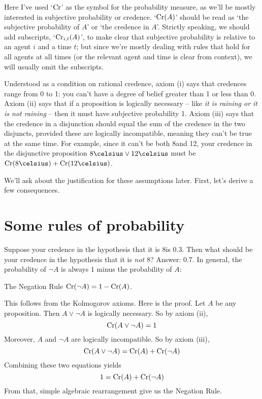 Here I've used `$\text{Cr}$' as the symbol for the probability measure, as
we'll be mostly interested in subjective probability or credence.
`$\text{Cr}(A)$' should be read as `the subjective probability of $A$' or
`the credence in $A$'. Strictly speaking, we should add subscripts,
`$\text{Cr}_{i,t}(A)$', to make clear that subjective probability is relative
to an agent $i$ and a time $t$; but since we're mostly dealing with
rules that hold for all agents at all times (or the relevant agent and
time is clear from context), we will usually omit the subscripts.

Understood as a condition on rational credence, axiom (i) says that
credences range from 0 to 1: you can't have a degree of belief greater
than 1 or less than 0. Axiom (ii) says that if a proposition is
logically necessary -- like \emph{it is raining or it is not raining}
-- then it must have subjective probability 1. Axiom (iii) says that
the credence in a disjunction should equal the sum of the credence in
the two disjuncts, provided these are logically incompatible, meaning
they can't be true at the same time. For example, since it can't be
both 8\celsius and 12\celsius, your credence in the disjunctive
proposition $8\celsius \lor 12\celsius$ must be
$\Cr(\text{8\celsius}) + \Cr(\text{12\celsius})$.

We'll ask about the justification for these assumptions later. First,
let's derive a few consequences.


\section{Some rules of probability}

Suppose your credence in the hypothesis that it is 8\celsius is
0.3. Then what should be your credence in the hypothesis that it is
\emph{not} 8\celsius? Answer: 0.7. In general, the probability of
$\neg A$ is always 1 minus the probability of $A$:

\begin{genericthm}{The Negation Rule}
  $\text{Cr}(\neg A) = 1 - \text{Cr}(A)$.
\end{genericthm}

This follows from the Kolmogorov axioms. Here is the proof. Let $A$ be
any proposition. Then $A \lor \neg A$ is logically necessary. So by
axiom (ii),
\[
  \text{Cr}(A \lor \neg A) = 1
\]
Moreover, $A$ and $\neg A$ are logically incompatible. So by axiom
(iii),
\[
  \text{Cr}(A \lor \neg A) = \text{Cr}(A) + \text{Cr}(\neg A)
\]
Combining these two equations yields
\[
  1 = \text{Cr}(A) + \text{Cr}(\neg A)
\]
From that, simple algebraic rearrangement give us the Negation Rule.

